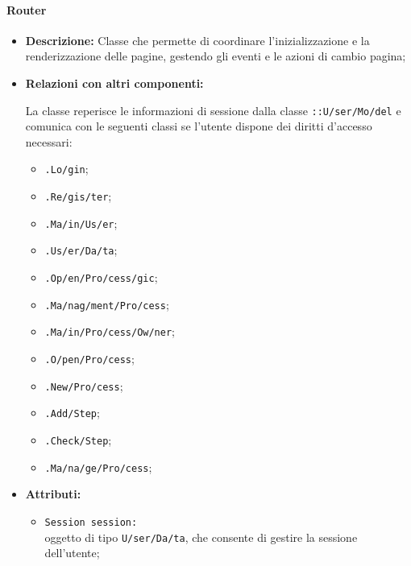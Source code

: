 \paragraph{Router}
\label{router}
\begin{flushleft}
\begin{itemize}
\item \textbf{Descrizione:} Classe che permette di coordinare l'inizializzazione e la renderizzazione delle pagine, gestendo gli eventi e le azioni di cambio pagina;
\item \textbf{Relazioni con altri componenti:}
\begin{sloppypar}
La classe reperisce le informazioni di sessione dalla classe \texttt{\model{}::U\fshyp{}ser\fshyp{}Mo\fshyp{}del} e comunica con le seguenti classi se l'utente dispone dei diritti d'accesso necessari:
\begin{itemize}
\item \texttt{\logic{}.Lo\fshyp{}gin};
\item \texttt{\logicUser{}.Re\fshyp{}gis\fshyp{}ter};
\item \texttt{\logicUser{}.Ma\fshyp{}in\fshyp{}Us\fshyp{}er};
\item \texttt{\logicUser{}.Us\fshyp{}er\fshyp{}Da\fshyp{}ta};
\item \texttt{\logicUser{}.Op\fshyp{}en\fshyp{}Pro\fshyp{}cess\fshyp{}gic};
\item \texttt{\logicUser{}.Ma\fshyp{}nag\fshyp{}ment\fshyp{}Pro\fshyp{}cess};
\item \texttt{\logicAdmin{}.Ma\fshyp{}in\fshyp{}Pro\fshyp{}cess\fshyp{}Ow\fshyp{}ner};
\item \texttt{\logicAdmin{}.O\fshyp{}pen\fshyp{}Pro\fshyp{}cess};
\item \texttt{\logicAdmin{}.New\fshyp{}Pro\fshyp{}cess};
\item \texttt{\logicAdmin{}.Add\fshyp{}Step};
\item \texttt{\logicAdmin{}.Check\fshyp{}Step};
\item \texttt{\logicAdmin{}.Ma\fshyp{}na\fshyp{}ge\fshyp{}Pro\fshyp{}cess};
\end{itemize}
\end{sloppypar}
\item \textbf{Attributi:}
\begin{sloppypar}
\begin{itemize}
\item \texttt{Session session:}\\ oggetto di tipo \texttt{\model{}U\fshyp{}ser\fshyp{}Da\fshyp{}ta}, che consente di gestire la sessione dell'utente;

\end{itemize}
\end{sloppypar}
\end{itemize}
\end{flushleft}
